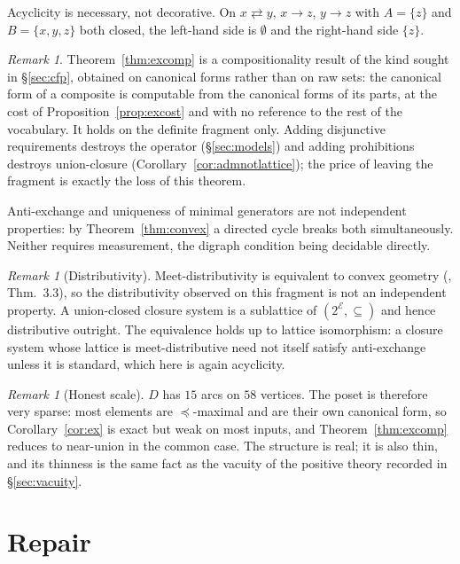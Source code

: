 \documentclass[11pt,reqno]{amsart}
\theoremstyle{plain}
\theoremstyle{definition}
\theoremstyle{remark}
\newtheorem{remark}[theorem]{Remark}
\newcommand{\El}{\mathcal{E}}
\begin{document}
Acyclicity is necessary, not decorative. On $x \rightleftarrows y$, $x \to z$,
$y \to z$ with $A = \{z\}$ and $B = \{x,y,z\}$ both closed, the left-hand side is
$\emptyset$ and the right-hand side $\{z\}$.

\begin{remark}
Theorem~\ref{thm:excomp} is a compositionality result of the kind sought in
\S\ref{sec:cfp}, obtained on canonical forms rather than on raw sets: the
canonical form of a composite is computable from the canonical forms of its
parts, at the cost of Proposition~\ref{prop:excost} and with no reference to
the rest of the vocabulary. It
holds on the definite fragment only. Adding disjunctive requirements destroys the
operator (\S\ref{sec:models}) and adding prohibitions destroys union-closure
(Corollary~\ref{cor:admnotlattice}); the price of leaving the fragment is exactly
the loss of this theorem.
\end{remark}

Anti-exchange and uniqueness of minimal generators are not independent
properties: by Theorem~\ref{thm:convex} a directed cycle breaks both
simultaneously. Neither requires measurement, the digraph condition being
decidable directly.

\begin{remark}[Distributivity]
Meet-distributivity is equivalent to convex geometry (\cite{edelman1980}, Thm.\ 3.3),
so the distributivity observed on this fragment is not an independent property.
A union-closed closure system is a sublattice of $(2^{\El}, \subseteq)$ and hence
distributive outright. The equivalence holds up to lattice isomorphism: a closure
system whose lattice is meet-distributive need not itself satisfy anti-exchange
unless it is standard, which here is again acyclicity.
\end{remark}

\begin{remark}[Honest scale]
$D$ has $15$ arcs on $58$ vertices. The poset is therefore very sparse: most
elements are $\preceq$-maximal and are their own canonical form, so
Corollary~\ref{cor:ex} is exact but weak on most inputs, and
Theorem~\ref{thm:excomp} reduces to near-union in the common case. The structure
is real; it is also thin, and its thinness is the same fact as the vacuity of the
positive theory recorded in \S\ref{sec:vacuity}.
\end{remark}

\section{Repair}
\end{document}
